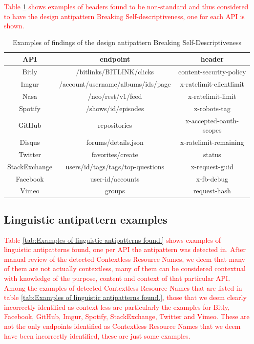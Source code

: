 \textcolor{red}{Table \ref{tab:Examples of findings of the design antipattern Breaking Self-Descriptiveness} shows examples of headers found to be non-standard and thus considered to have the design antipattern Breaking Self-descriptiveness, one for each API is shown. }

\begin{table}[htb!]
    \centering
    \begin{tabular}{|c|c|c|}
    \hline
     API & endpoint & header \\ \hline
     Bitly & /bitlinks/{BITLINK}/clicks & content-security-policy \\ \hline
     Imgur & /account/{username}/albums/ids/{page} & x-ratelimit-clientlimit \\ \hline
     Nasa & /neo/rest/v1/feed & x-ratelimit-limit \\ \hline
     Spotify & /shows/{id}/episodes & x-robots-tag \\ \hline
     GitHub & repositories & x-accepted-oauth-scopes \\ \hline
     Disqus & forums/details.json & x-ratelimit-remaining \\ \hline
     Twitter & favorites/create & status \\ \hline
     StackExchange & users/{id}/tags/{tags}/top-questions & x-request-guid \\ \hline
     Facebook & {user-id}/accounts & x-fb-debug \\ \hline
     Vimeo & groups & request-hash \\ \hline
    \end{tabular}
    \caption{Examples of findings of the design antipattern Breaking Self-Descriptiveness}
    \label{tab:Examples of findings of the design antipattern Breaking Self-Descriptiveness}
\end{table}

\subsection{Linguistic antipattern examples}

\textcolor{red}{Table \ref{tab:Examples of linguistic antipatterns found.} shows examples of linguistic antipatterns found, one per API the antipattern was detected in. After manual review of the detected Contextless Resource Names, we deem that many of them are not actually contextless, many of them can be considered contextual with knowledge of the purpose, content and context of that particular API. Among the examples of detected Contextless Resource Names that are listed in table \ref{tab:Examples of linguistic antipatterns found.}, those that we deem clearly incorrectly identified as context less are particularly the examples for Bitly, Facebook, GitHub, Imgur, Spotify, StackExchange, Twitter and Vimeo. These are not the only endpoints identified as Contextless Resource Names that we deem have been incorrectly identified, these are just some examples. }

